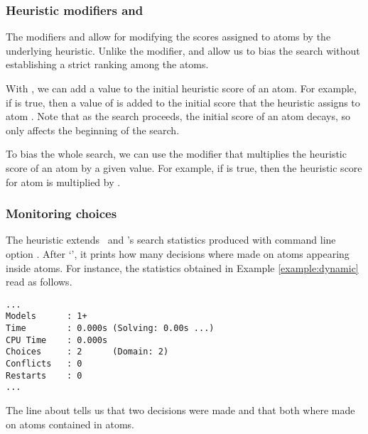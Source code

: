 \subsubsection{Heuristic modifiers  and }

The modifiers  and  allow for modifying the scores assigned to atoms by the underlying  heuristic.
Unlike the  modifier, 
 and  allow us to bias the search without establishing a strict ranking among the atoms.

With , we can add a value to the initial heuristic score of an atom.
For example, if  is true, then a value of  is added to
the initial score that the heuristic assigns to atom .
Note that as the search proceeds, the initial score of an atom decays, 
so  only affects the beginning of the search.

To bias the whole search, we can use the  modifier
that multiplies the heuristic score of an atom by a given value.
For example, if  is true, 
then the heuristic score for atom  is multiplied by .

\subsubsection{Monitoring  choices}

The  heuristic extends \clasp\ and \clingo's search statistics produced with command line option .
After `', it prints how many decisions where made on atoms appearing inside  atoms.
%
For instance, the statistics obtained in Example \ref{example:dynamic} read as follows.
\begin{lstlisting}[numbers=none]
...
Models      : 1+
Time        : 0.000s (Solving: 0.00s ...)
CPU Time    : 0.000s
Choices     : 2      (Domain: 2)
Conflicts   : 0
Restarts    : 0
...
\end{lstlisting}
The line about  tells us that two decisions were made 
and that both where made on atoms contained in  atoms.

